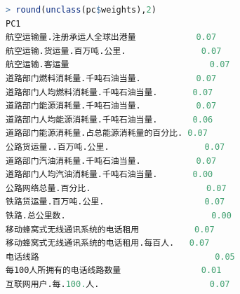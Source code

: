 \documentclass{apmcmthesis}
\begin{document}
\begin{lstlisting}[language=r]
> round(unclass(pc$weights),2)
PC1
航空运输量.注册承运人全球出港量            0.07
航空运输.货运量.百万吨.公里.               0.07
航空运输.客运量                            0.07
道路部门燃料消耗量.千吨石油当量.           0.07
道路部门人均燃料消耗量.千吨石油当量.       0.07
道路部门能源消耗量.千吨石油当量.           0.07
道路部门人均能源消耗量.千吨石油当量.       0.06
道路部门能源消耗量.占总能源消耗量的百分比. 0.07
公路货运量..百万吨.公里.                   0.07
道路部门汽油消耗量.千吨石油当量.           0.07
道路部门人均汽油消耗量.千吨石油当量.       0.00
公路网络总量.百分比.                       0.07
铁路货运量.百万吨.公里.                    0.07
铁路.总公里数.                             0.00
移动蜂窝式无线通讯系统的电话租用           0.07
移动蜂窝式无线通讯系统的电话租用.每百人.   0.07
电话线路                                   0.05
每100人所拥有的电话线路数量                0.01
互联网用户.每.100.人.                      0.07 
\end{lstlisting}
\end{document}
